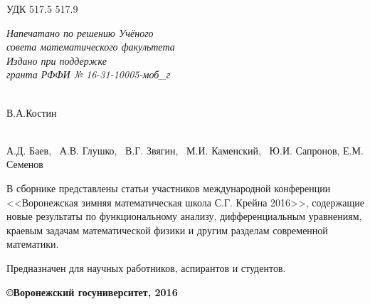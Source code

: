 \noindent УДК 517.5 517.9

\begin{flushright}
{\it Напечатано по решению Учёного \\ совета математического
факультета \\
\vspace{5mm} Издано при поддержке \\
гранта РФФИ № 16-31-10005-моб\_г }
 \end{flushright}
\vspace{15mm}{\bf Материалы работы международной конференции <<Воронежская зимняя математическая школа С.Г. Крейна - 2016>>. Воронеж: ВГУ, 2016 -  с.}

\vspace{5mm}

 \\
В.А.Костин

\vspace{5mm}

 \\
А.Д. Баев, \  А.В. Глушко, \ В.Г. Звягин, \ М.И. Каменский, \ Ю.И. Сапронов, Е.М. Семенов

\vspace{5mm}

В сборнике представлены статьи участников международной конференции <<Воронежская зимняя математическая школа С.Г. Крейна 2016>>, содержащие новые
результаты по функциональному анализу, дифференциальным уравнениям,
краевым задачам математической физики и другим разделам современной
математики.

Предназначен для научных работников, аспирантов и студентов. \\

\vspace{5mm}

\begin{flushright}
{\bf \copyright Воронежский госуниверситет, 2016}
\end{flushright}

\newpage
